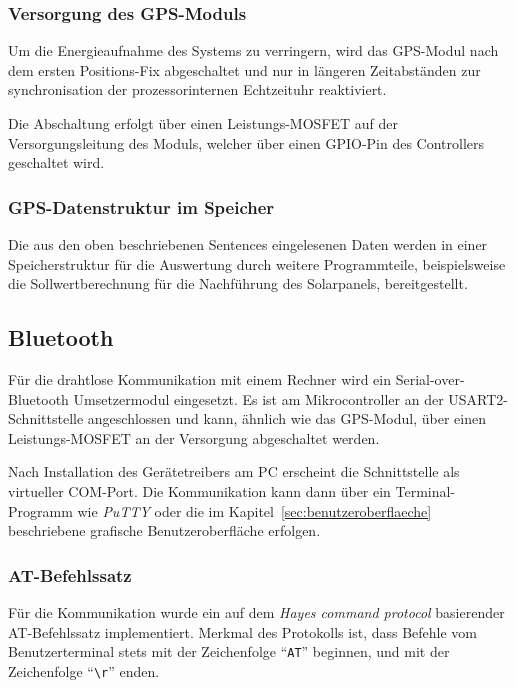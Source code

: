         \subsubsection{Versorgung des GPS-Moduls}
            Um die Energieaufnahme des Systems zu verringern, wird das GPS-Modul nach dem ersten Positions-Fix abgeschaltet und nur in längeren Zeitabständen zur synchronisation der prozessorinternen Echtzeituhr reaktiviert.
            
            Die Abschaltung erfolgt über einen Leistungs-MOSFET auf der Versorgungsleitung des Moduls, welcher über einen GPIO-Pin des Controllers geschaltet wird.
    
        \subsubsection{GPS-Datenstruktur im Speicher}
        Die aus den oben beschriebenen Sentences eingelesenen Daten werden in einer Speicherstruktur für die Auswertung durch weitere Programmteile, beispielsweise die Sollwertberechnung für die Nachführung des Solarpanels, bereitgestellt.
        
    \subsection{Bluetooth}\label{ssec:AT_Commands}
        Für die drahtlose Kommunikation mit einem Rechner wird ein Serial-over-Bluetooth Umsetzermodul eingesetzt. Es ist am Mikrocontroller an der USART2-Schnittstelle angeschlossen und kann, ähnlich wie das GPS-Modul, über einen Leistungs-MOSFET an der Versorgung abgeschaltet werden.
        
        Nach Installation des Gerätetreibers am PC erscheint die Schnittstelle als virtueller COM-Port. Die Kommunikation kann dann über ein Terminal-Programm wie \emph{PuTTY} oder die im Kapitel~\ref{sec:benutzeroberflaeche} beschriebene grafische Benutzeroberfläche erfolgen.
        
        \subsubsection{AT-Befehlssatz}
        Für die Kommunikation wurde ein auf dem \emph{Hayes command protocol} basierender AT-Befehlssatz implementiert. Merkmal des Protokolls ist, dass Befehle vom Benutzerterminal stets mit der Zeichenfolge ``\texttt{AT}'' beginnen, und mit der Zeichenfolge ``\texttt{\textbackslash r}'' enden.
        
